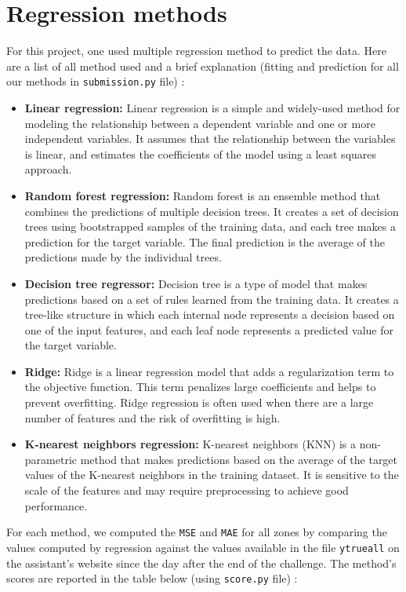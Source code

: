 \section{Regression methods}
For this project, one used multiple regression method to predict the data. Here are a list of all method used and a brief explanation (fitting and prediction for all our methods in \verb|submission.py| file) : 
\begin{itemize}
\item \textbf{Linear regression:} Linear regression is a simple and widely-used method for modeling the relationship between a dependent variable and one or more independent variables. It assumes that the relationship between the variables is linear, and estimates the coefficients of the model using a least squares approach.

\item \textbf{Random forest regression:} Random forest is an ensemble method that combines the predictions of multiple decision trees. It creates a set of decision trees using bootstrapped samples of the training data, and each tree makes a prediction for the target variable. The final prediction is the average of the predictions made by the individual trees.

\item \textbf{Decision tree regressor:} Decision tree is a type of model that makes predictions based on a set of rules learned from the training data. It creates a tree-like structure in which each internal node represents a decision based on one of the input features, and each leaf node represents a predicted value for the target variable.

\item \textbf{Ridge:} Ridge is a linear regression model that adds a regularization term to the objective function. This term penalizes large coefficients and helps to prevent overfitting. Ridge regression is often used when there are a large number of features and the risk of overfitting is high.

\item \textbf{K-nearest neighbors regression:} K-nearest neighbors (KNN) is a non-parametric method that makes predictions based on the average of the target values of the K-nearest neighbors in the training dataset. It is sensitive to the scale of the features and may require preprocessing to achieve good performance.
\end{itemize}

For each method, we computed the \verb|MSE| and \verb|MAE| for all zones by comparing the values computed by regression against the values available in the file \verb|ytrueall| on the assistant's website since the day after the end of the challenge. The method's scores are reported in the table below (using \verb|score.py| file) :

